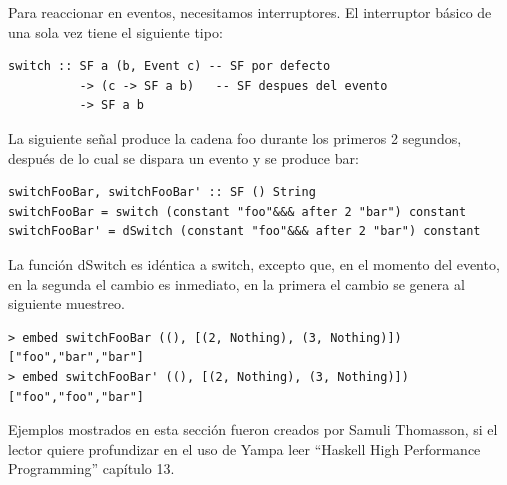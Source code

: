 Para reaccionar en eventos, necesitamos interruptores. El interruptor básico de una sola vez tiene el siguiente tipo:

\begin{lstlisting}[frame=single]
switch :: SF a (b, Event c) -- SF por defecto
          -> (c -> SF a b)   -- SF despues del evento
          -> SF a b
\end{lstlisting}

La siguiente señal produce la cadena foo durante los primeros 2 segundos, después de lo cual se dispara un evento y se produce bar:

\begin{lstlisting}[frame=single]
switchFooBar, switchFooBar' :: SF () String
switchFooBar = switch (constant "foo"&&& after 2 "bar") constant
switchFooBar' = dSwitch (constant "foo"&&& after 2 "bar") constant
\end{lstlisting}

La función dSwitch es idéntica a switch, excepto que, en el momento del evento, en la segunda el cambio es inmediato, en la primera el cambio se genera al siguiente muestreo.

\begin{lstlisting}[frame=single]
> embed switchFooBar ((), [(2, Nothing), (3, Nothing)])
["foo","bar","bar"]
> embed switchFooBar' ((), [(2, Nothing), (3, Nothing)])
["foo","foo","bar"]
\end{lstlisting}

Ejemplos mostrados en esta sección fueron creados por Samuli Thomasson, si el lector quiere profundizar en el uso de Yampa leer ``Haskell High Performance Programming'' \cite{thomasson2016haskell} capítulo 13.

